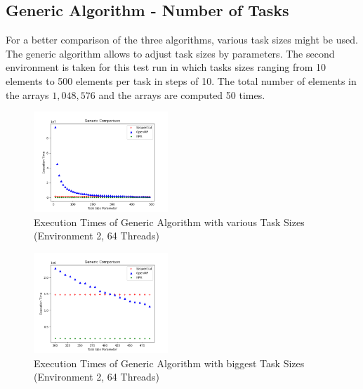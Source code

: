 \subsection{Generic Algorithm - Number of Tasks}
For a better comparison of the three algorithms, various task sizes might be used.
The generic algorithm allows to adjust task sizes by parameters.
The second environment is taken for this test run in which tasks sizes ranging from 10 elements to 500 elements per task in steps of 10.
The total number of elements in the arrays \(1,048,576\) and the arrays are computed 50 times.
\begin{figure}[h]
	\centering
	\includegraphics[width=0.45\textwidth]{figures/genericComp.png}
	\caption{Execution Times of Generic Algorithm with various Task Sizes (Environment 2, 64 Threads)}
	\label{fig:genComp}
\end{figure}

\begin{figure}[h]
	\centering
	\includegraphics[width=0.45\textwidth]{figures/genericCompLast.png}
	\caption{Execution Times of Generic Algorithm with biggest Task Sizes (Environment 2, 64 Threads)}
	\label{fig:genComp_Last}
\end{figure}

